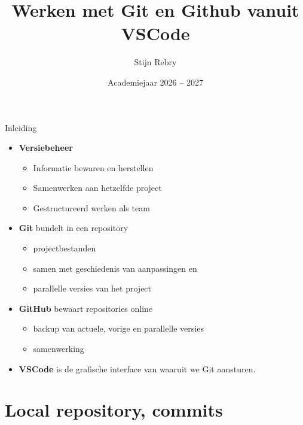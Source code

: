 \documentclass
[kulak] %
{kulakbeamer}
\title{Werken met Git en Github vanuit VSCode}
\author{Stijn Rebry}
\date{Academiejaar 2026 -- 2027}
\begin{document}
	
	\begin{titleframe}
		\titlepage
	\end{titleframe}

    \begin{frame}{Inleiding}
		\begin{itemize}
            \item \textbf{Versiebeheer}
            \begin{itemize}
                \item Informatie bewaren en herstellen
                \item Samenwerken aan hetzelfde project
                \item Gestructureerd werken als team
            \end{itemize} \pause
			\item \textbf{Git} bundelt in een repository
            \begin{itemize}
                \item projectbestanden
                \item samen met geschiedenis van aanpassingen en
                \item parallelle versies van het project
            \end{itemize} 
			\item \textbf{GitHub} bewaart repositories online
            \begin{itemize}
                \item backup van actuele, vorige en parallelle versies
                \item samenwerking
            \end{itemize}
			\item \textbf{VSCode} is de grafische interface van waaruit we Git aansturen.
		\end{itemize}
	\end{frame}

	\begin{outlineframe}[Overzicht]
		\tableofcontents
	\end{outlineframe}
	
	\section{Local repository, commits}
	
\end{document}

